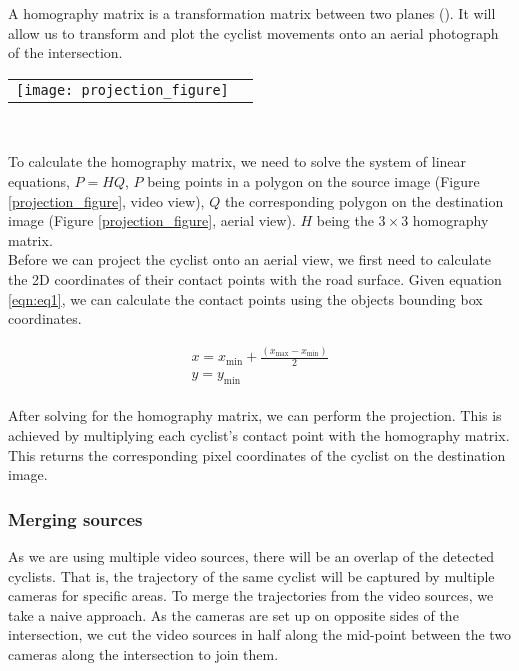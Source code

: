A homography matrix is a transformation matrix between two planes (\cite{hartley_zisserman_2004}).
It will allow us to transform and plot the cyclist movements onto an aerial photograph of 
the intersection.
\ \\ 

\noindent
\begin{tabular}{@{}cc}
\texttt{[image: projection\_figure]} 
\end{tabular}
\label{projection_figure}
\

To calculate the homography matrix, we need to solve the system of linear equations, $P = HQ$,
$P$ being points in a polygon on the source image (Figure \ref{projection_figure}, video view), $Q$ the corresponding polygon on the destination image (Figure \ref{projection_figure}, aerial view). 
$H$ being the $3 \times 3$ homography matrix.
\ \\

Before we can project the cyclist onto an aerial view, we first need to calculate the 2D coordinates of their contact points with the road surface.
Given equation \ref{eqn:eq1}, we can calculate the contact points using the objects bounding box coordinates.

\begin{equation}
\label{eqn:eq1}
\begin{array}{l}
x = x_\mathrm{min} + \frac{(x_\mathrm{max} - x_\mathrm{min})}{2} \\
y = y_\mathrm{min}
\end{array}
\end{equation}
\ \\

After solving for the homography matrix, we can perform the projection.
This is achieved by multiplying each cyclist's contact point with the homography matrix. This returns the 
corresponding pixel coordinates of the cyclist on the destination image. 
  
\subsubsection{Merging sources}
As we are using multiple video sources, there will be an overlap of the detected cyclists. 
That is, the trajectory of the same cyclist will be captured by multiple cameras for specific areas. 
To merge the trajectories from the video sources, we take a naive approach. As the cameras are set up on
opposite sides of the intersection, we cut the video sources in half along the mid-point between
the two cameras along the intersection to join them.

